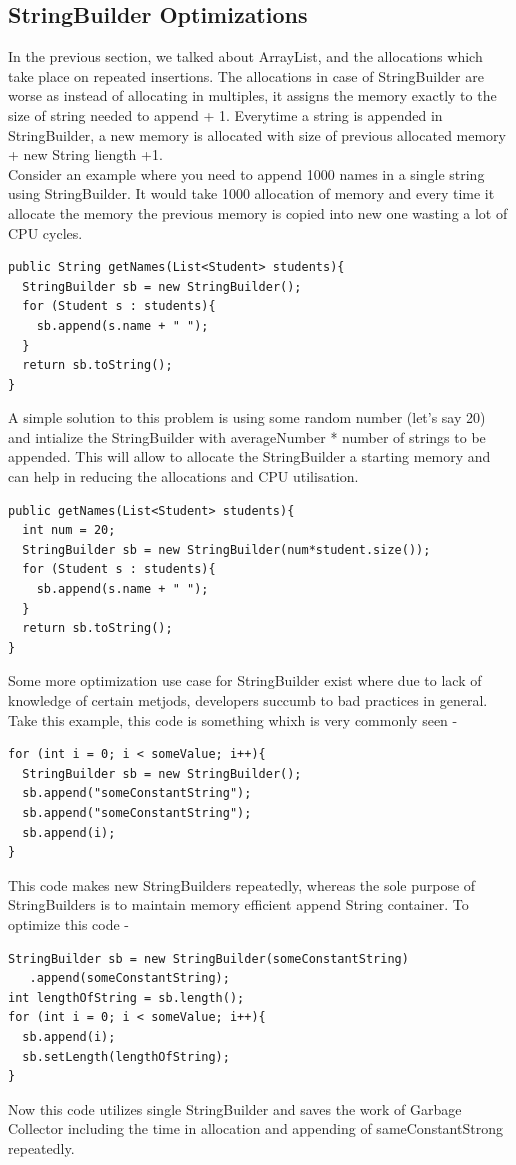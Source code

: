 \documentclass[journal]{IEEEtran}
\begin{document}
\subsection{StringBuilder Optimizations}
In the previous section, we talked about ArrayList, and the allocations which take place on repeated insertions. The allocations in case of StringBuilder are worse as instead of allocating in multiples, it assigns the memory exactly to the size of string needed to append + 1. Everytime a string is appended in StringBuilder, a new memory is allocated with size of previous allocated memory + new String liength +1.\\
Consider an example where you need to append 1000 names in a single string using StringBuilder. It would take 1000 allocation of memory and every time it allocate the memory the previous memory is copied into new one wasting a lot of CPU cycles.
\begin{verbatim}
public String getNames(List<Student> students){
  StringBuilder sb = new StringBuilder();
  for (Student s : students){
    sb.append(s.name + " ");
  }
  return sb.toString();
}
\end{verbatim}
A simple solution to this problem is using some random number (let's say 20) and intialize the StringBuilder with averageNumber * number of strings to be appended. This will allow to allocate the StringBuilder a starting memory and can help in reducing the allocations and CPU utilisation.
\begin{verbatim}
public getNames(List<Student> students){
  int num = 20;
  StringBuilder sb = new StringBuilder(num*student.size());
  for (Student s : students){
    sb.append(s.name + " ");
  }
  return sb.toString();
}
\end{verbatim}
Some more optimization use case for StringBuilder exist where due to lack of knowledge of certain metjods, developers succumb to bad practices in general. Take this example, this code is something whixh is very commonly seen -
\begin{verbatim}
for (int i = 0; i < someValue; i++){
  StringBuilder sb = new StringBuilder();
  sb.append("someConstantString");
  sb.append("someConstantString");
  sb.append(i);
}
\end{verbatim}
This code makes new StringBuilders repeatedly, whereas the sole purpose of StringBuilders is to maintain memory efficient append String container. To optimize this code - 
\begin{verbatim}
StringBuilder sb = new StringBuilder(someConstantString)
   .append(someConstantString);
int lengthOfString = sb.length();
for (int i = 0; i < someValue; i++){
  sb.append(i);
  sb.setLength(lengthOfString);
}
\end{verbatim}
Now this code utilizes single StringBuilder and saves the work of Garbage Collector including the time in allocation and appending of sameConstantStrong repeatedly.
\end{document}
